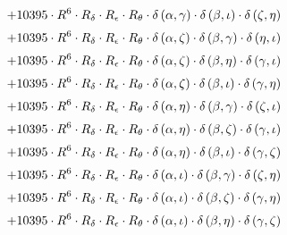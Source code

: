 \begin{subequations}
\begin{gather}
 \\[0.2em] \notag 		 + 10395 \cdot R^{6} \cdot R_{\delta{}} \cdot R_{\epsilon{}} \cdot R_{\theta{}} \cdot \delta{}\left(\alpha{}, \gamma{}\right) \cdot \delta{}\left(\beta{}, \iota{}\right) \cdot \delta{}\left(\zeta{}, \eta{}\right) 
 \\[0.2em] \notag 		 + 10395 \cdot R^{6} \cdot R_{\delta{}} \cdot R_{\epsilon{}} \cdot R_{\theta{}} \cdot \delta{}\left(\alpha{}, \zeta{}\right) \cdot \delta{}\left(\beta{}, \gamma{}\right) \cdot \delta{}\left(\eta{}, \iota{}\right) 
 \\[0.2em] \notag 		 + 10395 \cdot R^{6} \cdot R_{\delta{}} \cdot R_{\epsilon{}} \cdot R_{\theta{}} \cdot \delta{}\left(\alpha{}, \zeta{}\right) \cdot \delta{}\left(\beta{}, \eta{}\right) \cdot \delta{}\left(\gamma{}, \iota{}\right) 
 \\[0.2em] \notag 		 + 10395 \cdot R^{6} \cdot R_{\delta{}} \cdot R_{\epsilon{}} \cdot R_{\theta{}} \cdot \delta{}\left(\alpha{}, \zeta{}\right) \cdot \delta{}\left(\beta{}, \iota{}\right) \cdot \delta{}\left(\gamma{}, \eta{}\right) 
 \\[0.2em] \notag 		 + 10395 \cdot R^{6} \cdot R_{\delta{}} \cdot R_{\epsilon{}} \cdot R_{\theta{}} \cdot \delta{}\left(\alpha{}, \eta{}\right) \cdot \delta{}\left(\beta{}, \gamma{}\right) \cdot \delta{}\left(\zeta{}, \iota{}\right) 
 \\[0.2em] \notag 		 + 10395 \cdot R^{6} \cdot R_{\delta{}} \cdot R_{\epsilon{}} \cdot R_{\theta{}} \cdot \delta{}\left(\alpha{}, \eta{}\right) \cdot \delta{}\left(\beta{}, \zeta{}\right) \cdot \delta{}\left(\gamma{}, \iota{}\right) 
 \\[0.2em] \notag 		 + 10395 \cdot R^{6} \cdot R_{\delta{}} \cdot R_{\epsilon{}} \cdot R_{\theta{}} \cdot \delta{}\left(\alpha{}, \eta{}\right) \cdot \delta{}\left(\beta{}, \iota{}\right) \cdot \delta{}\left(\gamma{}, \zeta{}\right) 
 \\[0.2em] \notag 		 + 10395 \cdot R^{6} \cdot R_{\delta{}} \cdot R_{\epsilon{}} \cdot R_{\theta{}} \cdot \delta{}\left(\alpha{}, \iota{}\right) \cdot \delta{}\left(\beta{}, \gamma{}\right) \cdot \delta{}\left(\zeta{}, \eta{}\right) 
 \\[0.2em] \notag 		 + 10395 \cdot R^{6} \cdot R_{\delta{}} \cdot R_{\epsilon{}} \cdot R_{\theta{}} \cdot \delta{}\left(\alpha{}, \iota{}\right) \cdot \delta{}\left(\beta{}, \zeta{}\right) \cdot \delta{}\left(\gamma{}, \eta{}\right) 
 \\[0.2em] \notag 		 + 10395 \cdot R^{6} \cdot R_{\delta{}} \cdot R_{\epsilon{}} \cdot R_{\theta{}} \cdot \delta{}\left(\alpha{}, \iota{}\right) \cdot \delta{}\left(\beta{}, \eta{}\right) \cdot \delta{}\left(\gamma{}, \zeta{}\right) 

\end{gather}
\end{subequations}
